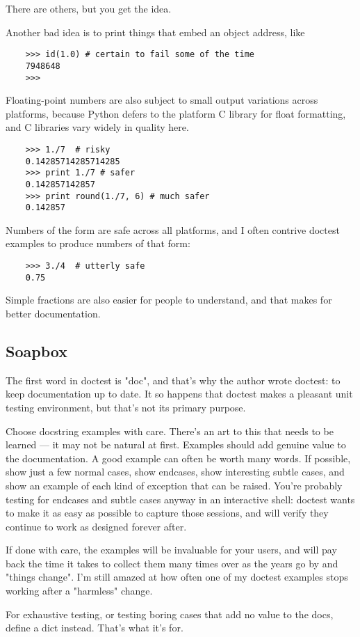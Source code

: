 \begin{enumerate}
There are others, but you get the idea.

Another bad idea is to print things that embed an object address, like

\begin{verbatim}
    >>> id(1.0) # certain to fail some of the time
    7948648
    >>>
\end{verbatim}

Floating-point numbers are also subject to small output variations across
platforms, because Python defers to the platform C library for float
formatting, and C libraries vary widely in quality here.

\begin{verbatim}
    >>> 1./7  # risky
    0.14285714285714285
    >>> print 1./7 # safer
    0.142857142857
    >>> print round(1./7, 6) # much safer
    0.142857
\end{verbatim}

Numbers of the form  are safe across all platforms, and I
often contrive doctest examples to produce numbers of that form:

\begin{verbatim}
    >>> 3./4  # utterly safe
    0.75
\end{verbatim}

Simple fractions are also easier for people to understand, and that makes
for better documentation.
\end{enumerate}


\subsection{Soapbox}

The first word in doctest is "doc", and that's why the author wrote
doctest:  to keep documentation up to date.  It so happens that doctest
makes a pleasant unit testing environment, but that's not its primary
purpose.

Choose docstring examples with care.  There's an art to this that needs to
be learned --- it may not be natural at first.  Examples should add genuine
value to the documentation.  A good example can often be worth many words.
If possible, show just a few normal cases, show endcases, show interesting
subtle cases, and show an example of each kind of exception that can be
raised.  You're probably testing for endcases and subtle cases anyway in an
interactive shell:  doctest wants to make it as easy as possible to capture
those sessions, and will verify they continue to work as designed forever
after.

If done with care, the examples will be invaluable for your users, and will
pay back the time it takes to collect them many times over as the years go
by and "things change".  I'm still amazed at how often one of my doctest
examples stops working after a "harmless" change.

For exhaustive testing, or testing boring cases that add no value to the
docs, define a  dict instead.  That's what it's for.
